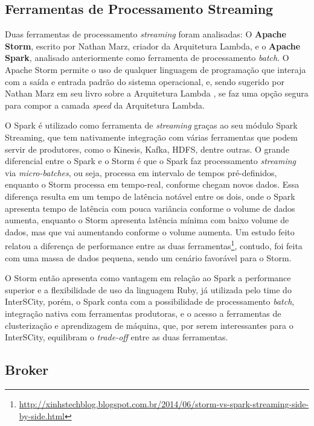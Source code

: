 
\subsection{Ferramentas de Processamento Streaming}

Duas ferramentas de processamento \textit{streaming} foram analisadas: O
\textbf{Apache Storm}, escrito por Nathan Marz, criador da Arquitetura
Lambda, e o \textbf{Apache Spark}, analisado anteriormente como ferramenta de
processamento \textit{batch}. O Apache Storm permite o uso de qualquer
linguagem de programação que interaja com a saída e entrada padrão do sistema
operacional, e, sendo sugerido por Nathan Marz em seu livro sobre a Arquitetura
Lambda \cite{marz2015}, se faz uma opção segura para compor a camada
\textit{speed} da Arquitetura Lambda.

O Spark é utilizado como ferramenta de \textit{streaming} graças ao seu módulo
Spark Streaming, que tem nativamente integração com várias ferramentas que
podem servir de produtores, como o Kinesis, Kafka, HDFS, dentre outras. O
grande diferencial entre o Spark e o Storm é que o Spark faz processamento
\textit{streaming} via \textit{micro-batches}, ou seja, processa em intervalo
de tempos pré-definidos, enquanto o Storm processa em tempo-real, conforme
chegam novos dados. Essa diferença resulta em um tempo de latência notável
entre os dois, onde o Spark apresenta tempo de latência com pouca variância
conforme o volume de dados aumenta, enquanto o Storm apresenta latência mínima
com baixo volume de dados, mas que vai aumentando conforme o volume aumenta.
Um estudo feito relatou a diferença de performance entre as duas
ferramentas\footnote{\url{http://xinhstechblog.blogspot.com.br/2014/06/storm-vs-spark-streaming-side-by-side.html}},
contudo, foi feita com uma massa de dados pequena, sendo um cenário favorável
para o Storm.

O Storm então apresenta como vantagem em relação ao Spark a performance
superior e a flexibilidade de uso da linguagem Ruby, já utilizada pelo time
do InterSCity, porém, o Spark conta com a possibilidade de processamento
\textit{batch}, integração nativa com ferramentas produtoras, e o acesso a
ferramentas de clusterização e aprendizagem de máquina, que, por serem
interessantes para o InterSCity, equilibram o \textit{trade-off} entre as
duas ferramentas.

\subsection{Broker}

